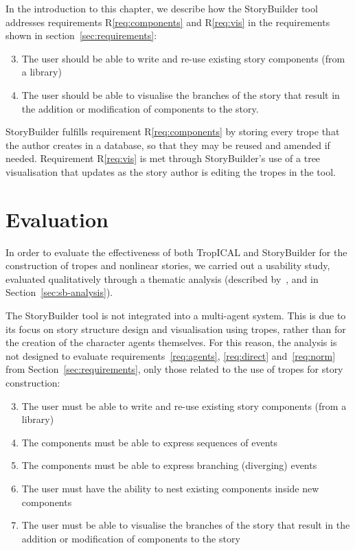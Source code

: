\documentclass[11pt]{report}
\begin{document}

In the introduction to this chapter, we describe how the StoryBuilder tool
addresses requirements R\ref{req:components} and R\ref{req:vis} in the
requirements shown in section~\ref{sec:requirements}:

\begin{enumerate}[R1.]
  \setcounter{enumi}{2}
  \item The user should be able to write and re-use
    existing story components (from a library)
  \setcounter{enumi}{6}
  \item The user should be able to visualise the branches of the
    story that result in the addition or modification of components to the story.
\end{enumerate}

StoryBuilder fulfills requirement R\ref{req:components} by storing every trope
that the author creates in a database, so that they may be reused and amended if
needed. Requirement R\ref{req:vis} is met through StoryBuilder's use of a tree
visualisation that updates as the story author is editing the tropes in the tool.

\section{Evaluation}
\label{sec:sb-eval}

In order to evaluate the effectiveness of both TropICAL and StoryBuilder for the
construction of tropes and nonlinear stories, we carried out a usability study,
evaluated qualitatively through a thematic analysis (described
by~\citet{clarke2014thematic}, and in Section~\ref{sec:sb-analysis}).

The StoryBuilder tool is not integrated into a multi-agent system. This is due
to its focus on story structure design and visualisation using tropes, rather
than for the creation of the character agents themselves. For this reason, the
analysis is not designed to evaluate requirements~\ref{req:agents},
\ref{req:direct} and~\ref{req:norm} from Section~\ref{sec:requirements}, only
those related to the use of tropes for story construction:

\begin{enumerate}[R1.]
  \setcounter{enumi}{2}
  \item The user must be able to write and re-use
    existing story components (from a library)
  \item The components must be able to express sequences of
    events
  \item The components must be able to express branching
    (diverging) events
  \item The user must have the ability to nest existing
    components inside new components
  \item The user must be able to visualise the branches of the
    story that result in the addition or modification of components to the
    story
\end{enumerate}
\end{document}
